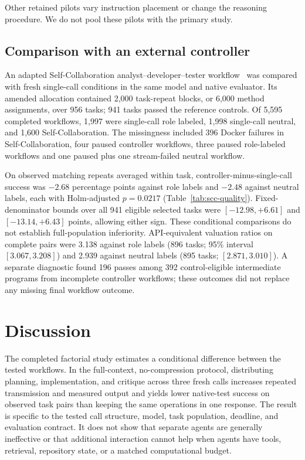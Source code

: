 \documentclass[pdflatex,sn-nature]{scientificreports}
\begin{document}
Other retained pilots vary instruction placement or change the reasoning procedure. We do not pool these pilots with the primary study.

\subsection{Comparison with an external controller}
An adapted Self-Collaboration analyst--developer--tester workflow~\cite{dong2023selfcollaboration,scc2024source} was compared with fresh single-call conditions in the same model and native evaluator. Its amended allocation contained 2,000 task-repeat blocks, or 6,000 method assignments, over 956 tasks; 941 tasks passed the reference controls. Of 5,595 completed workflows, 1,997 were single-call role labeled, 1,998 single-call neutral, and 1,600 Self-Collaboration. The missingness included 396 Docker failures in Self-Collaboration, four paused controller workflows, three paused role-labeled workflows and one paused plus one stream-failed neutral workflow.

On observed matching repeats averaged within task, controller-minus-single-call success was $-2.68$ percentage points against role labels and $-2.48$ against neutral labels, each with Holm-adjusted $p=0.0217$ (Table~\ref{tab:scc-quality}). Fixed-denominator bounds over all 941 eligible selected tasks were $[-12.98,+6.61]$ and $[-13.14,+6.43]$ points, allowing either sign. These conditional comparisons do not establish full-population inferiority. API-equivalent valuation ratios on complete pairs were 3.138 against role labels (896 tasks; 95\% interval $[3.067,3.208]$) and 2.939 against neutral labels (895 tasks; $[2.871,3.010]$). A separate diagnostic found 196 passes among 392 control-eligible intermediate programs from incomplete controller workflows; these outcomes did not replace any missing final workflow outcome.



\section{Discussion}
The completed factorial study estimates a conditional difference between the tested workflows. In the full-context, no-compression protocol, distributing planning, implementation, and critique across three fresh calls increases repeated transmission and measured output and yields lower native-test success on observed task pairs than keeping the same operations in one response. The result is specific to the tested call structure, model, task population, deadline, and evaluation contract. It does not show that separate agents are generally ineffective or that additional interaction cannot help when agents have tools, retrieval, repository state, or a matched computational budget.
\end{document}
